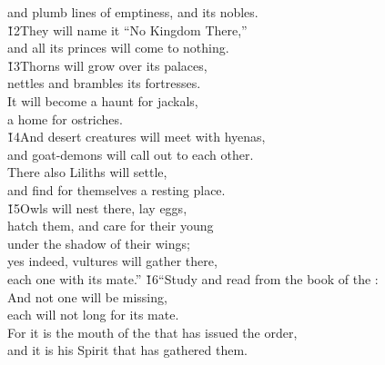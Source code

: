 \begin{poetry}
\poemll    and plumb lines of emptiness, and its nobles. \\
\poeml \v{12}They will name it ``No Kingdom There,'' \\
\poemll    and all its princes will come to nothing. \\
\poeml \v{13}Thorns will grow over its palaces, \\
\poemll    nettles and brambles its fortresses. \\
\poeml It will become a haunt for jackals, \\
\poemll    a home for ostriches. \\
\poeml \v{14}And desert creatures will meet with hyenas, \\
\poemll    and goat-demons will call out to each other. \\
\poeml There also Liliths will settle, \\
\poemll    and find for themselves a resting place. \\
\poeml \v{15}Owls will nest there, lay eggs, \\
\poemll    hatch them, and care for their young \\
\poemlll       under the shadow of their wings; \\
\poeml yes indeed, vultures will gather there, \\
\poemll    each one with its mate.''
\poeml \v{16}``Study and read from the book of the : \\
\poemll    And not one will be missing, \\
\poemlll       each will not long for its mate. \\
\poeml For it is the mouth of the  that has issued the order, \\
\poemll    and it is his Spirit that has gathered them. \\

\end{poetry}

